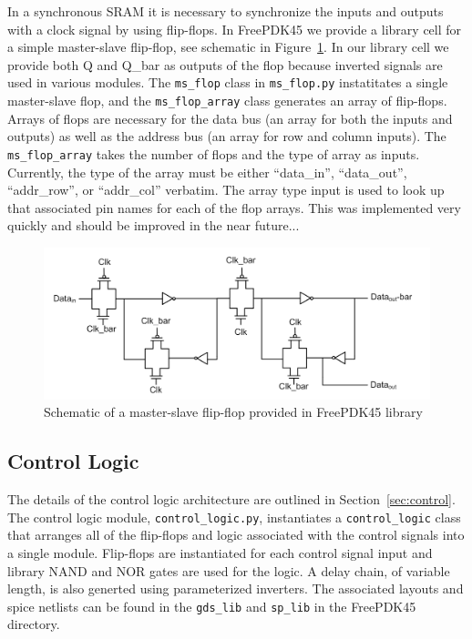 In a synchronous SRAM it is necessary to synchronize the inputs and
outputs with a clock signal by using flip-flops.  In FreePDK45 we
provide a library cell for a simple master-slave flip-flop, see
schematic in Figure~\ref{fig:ms_flop}.  In our library cell we provide
both Q and Q\_bar as outputs of the flop because inverted signals are
used in various modules.  The \verb|ms_flop| class in \verb|ms_flop.py|
instatitates a single master-slave flop, and the \verb|ms_flop_array| class
generates an array of flip-flops.  Arrays of flops are necessary for
the data bus (an array for both the inputs and outputs) as well as the
address bus (an array for row and column inputs).  The \verb|ms_flop_array|
takes the number of flops and the type of array as inputs.  Currently,
the type of the array must be either ``data\_in'', ``data\_out'',
``addr\_row'', or ``addr\_col'' verbatim.  The array type input is
used to look up that associated pin names for each of the flop arrays.
This was implemented very quickly and should be improved in the near
future...

\begin{figure}[h!]
\centering
\includegraphics[scale=.7]{./figs/ms_flop_schem.pdf}
\caption{Schematic of a master-slave flip-flop provided in FreePDK45 library}
\label{fig:ms_flop}
\end{figure}

\subsection{Control Logic}

The details of the control logic architecture are outlined in
Section~\ref{sec:control}.  The control logic module,
\verb|control_logic.py|, instantiates a \verb|control_logic| class that arranges
all of the flip-flops and logic associated with the control signals
into a single module. Flip-flops are instantiated for each control
signal input and library NAND and NOR gates are used for the logic.  A
delay chain, of variable length, is also generted using parameterized
inverters.  The associated layouts and spice netlists can be found in
the \verb|gds_lib| and \verb|sp_lib| in the FreePDK45 directory.

